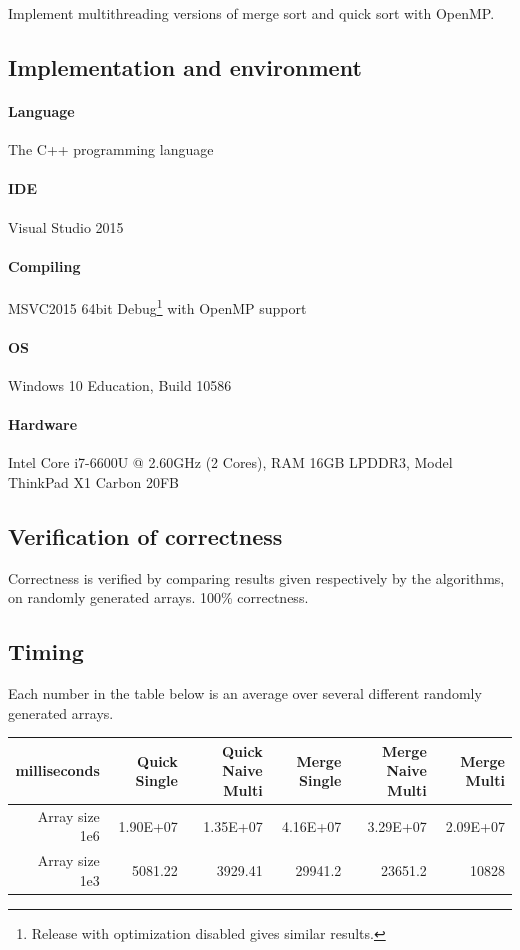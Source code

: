 \begin{homeworkProblem}

Implement multithreading versions of merge sort and quick sort with OpenMP.

\subsection{Implementation and environment}
\paragraph{Language} The C++ programming language
\paragraph{IDE} Visual Studio 2015
\paragraph{Compiling} MSVC2015 64bit Debug\footnote{Release with optimization disabled gives similar results.} with OpenMP support
\paragraph{OS} Windows 10 Education, Build 10586
\paragraph{Hardware} Intel Core i7-6600U @ 2.60GHz (2 Cores), RAM 16GB LPDDR3, Model ThinkPad X1 Carbon 20FB

\subsection{Verification of correctness}

Correctness is verified by comparing results given respectively by the algorithms, on randomly generated arrays. 100\% correctness.

\subsection{Timing}
Each number in the table below is an average over several different randomly generated arrays.
\begin{center}
\begin{tabular}{rrrrrr}
\hline
milliseconds&   Quick Single&	Quick Naive Multi&	Merge Single&	Merge Naive Multi&	Merge Multi\\
\hline
Array size 1e6&	1.90E+07&	1.35E+07&	4.16E+07&	3.29E+07&	2.09E+07\\
Array size 1e3& 	5081.22&	3929.41&	29941.2&	23651.2&	10828\\
\hline
\end{tabular}
\end{center}


\end{homeworkProblem}
